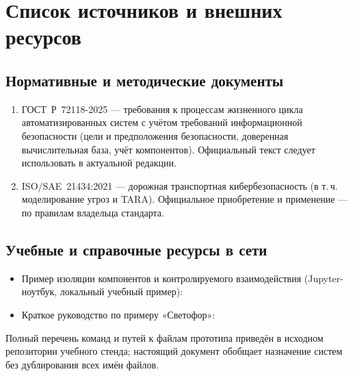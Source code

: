 \chapter{Список источников и внешних ресурсов}
\label{ch:sources}

\section{Нормативные и методические документы}

\begin{enumerate}
  \item ГОСТ~Р~72118-2025 --- требования к процессам жизненного цикла автоматизированных систем с учётом требований информационной безопасности (цели и предположения безопасности, доверенная вычислительная база, учёт компонентов). Официальный текст следует использовать в актуальной редакции.
  \item ISO/SAE~21434:2021 --- дорожная транспортная кибербезопасность (в т.\,ч. моделирование угроз и TARA). Официальное приобретение и применение --- по правилам владельца стандарта.
\end{enumerate}

\section{Учебные и справочные ресурсы в сети}

\begin{itemize}
  \item Пример изоляции компонентов и контролируемого взаимодействия (Jupyter-ноутбук, локальный учебный пример):\\
  \item Краткое руководство по примеру «Светофор»: 
\end{itemize}

Полный перечень команд и путей к файлам прототипа приведён в исходном репозитории учебного стенда; настоящий документ обобщает назначение систем без дублирования всех имён файлов.

